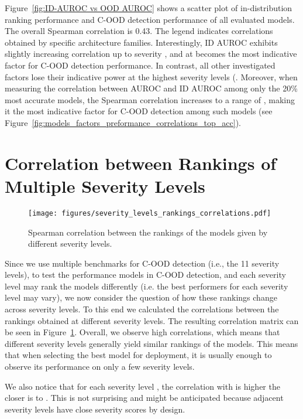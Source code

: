 \documentclass[table]{article} \usepackage{PRIMEarxiv}
\begin{document}
Figure~\ref{fig:ID-AUROC vs OOD AUROC} shows a scatter plot of in-distribution ranking performance and C-OOD detection performance of all evaluated models. The overall Spearman correlation is 0.43. The legend indicates correlations obtained by specific architecture families. 
Interestingly, ID AUROC exhibits slightly increasing correlation up to severity
, and at  becomes the most indicative factor for C-OOD detection performance.
In contrast, all other investigated factors lose their indicative power at the highest severity levels (.
Moreover, when measuring the correlation between AUROC and ID AUROC among only the 20\% most accurate models, the Spearman correlation increases to a range of , making it the most indicative factor for C-OOD detection among such models (see Figure~\ref{fig:models_factors_preformance_correlations_top_acc}).

\section{Correlation between Rankings of Multiple Severity Levels}
\label{sec:rankings of sevl}

\begin{figure}[h]
    \centering
    \texttt{[image: figures/severity\_levels\_rankings\_correlations.pdf]}
    \caption{Spearman correlation between the rankings of the models given by different severity levels.
    }
    \label{fig:models_rankings_correlations}
\end{figure}
Since we use multiple benchmarks for C-OOD detection 
(i.e., the 11 severity levels), to test the performance models in C-OOD detection, and each severity level may rank the models differently (i.e. the best performers for each severity level may vary), we now consider 
the question of how  these rankings change across severity levels.
To this end we calculated the correlations between the rankings obtained at different severity levels. The resulting correlation matrix can be seen in Figure~\ref{fig:models_rankings_correlations}. Overall, we observe high correlations, which means that different severity levels generally yield similar rankings of the models. 
This means that when selecting the best model for deployment, it is usually enough to observe its performance on only a few severity levels.

We also notice that for each severity level , the correlation with
 is higher the closer  is to .
This is not surprising and might be anticipated 
because adjacent severity levels have close severity scores by design.
\end{document}
